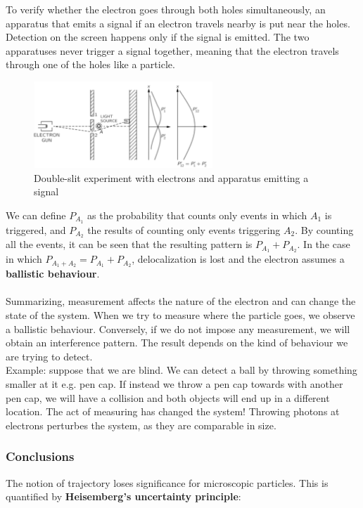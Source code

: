    \noindent
    To verify whether the electron goes through both holes simultaneously, an apparatus that emits a signal if an electron travels nearby is put near the holes.
    Detection on the screen happens only if the signal is emitted.
    The two apparatuses never trigger a signal together, meaning that the electron travels through one of the holes like a particle.
    \begin{figure}[h!]
    \centering
    \includegraphics[clip, width=0.6\textwidth]{ele_bal_ds.png}
    \caption{\label{fig:ele_bal_ds} Double-slit experiment with electrons and apparatus emitting a signal}
\end{figure}
   \noindent
    We can define $P_{A_1}$ as the probability that counts only events in which $A_1$ is triggered, and $P_{A_2}$ the results of counting only events triggering $A_2$.
    By counting all the events, it can be seen that the resulting pattern is $P_{A_1}+P_{A_2}$.
    In the case in which $P_{A_1+A_2} = P_{A_1} + P_{A_2}$, delocalization is lost and the electron assumes a \textbf{ballistic behaviour}.\\
    \\
    \noindent
    Summarizing, measurement affects the nature of the electron and can change the state of the system.
When we try to measure where the particle goes, we observe a ballistic behaviour. Conversely, if we do not impose any measurement, we will obtain an interference pattern. The result depends on the kind of behaviour we are trying to detect. \\

Example: suppose that we are blind. We can detect a ball by throwing something smaller at it e.g. pen cap. If instead we throw a pen cap towards with another pen cap, we will have a collision and both objects will end up in a different location. The act of measuring has changed the system! 
Throwing photons at electrons perturbes the system, as they are comparable in size.

    \subsubsection{Conclusions}
    The notion of trajectory loses significance for microscopic particles.
    This is quantified by \textbf{Heisemberg's uncertainty principle}:


